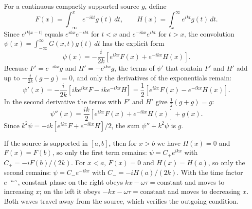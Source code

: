 For a continuous compactly supported source $g$, define
\[
F(x)=\int_{-\infty}^xe^{-ikt}g(t)\,dt,\qquad
H(x)=\int_x^\infty e^{ikt}g(t)\,dt.
\]
Since $e^{ik|x-t|}$ equals $e^{ikx}e^{-ikt}$ for $t<x$ and
$e^{-ikx}e^{ikt}$ for $t>x$, the convolution
$\psi(x)=\int_{-\infty}^\infty G(x,t)g(t)\,dt$ has the explicit form
\[
\psi(x)=-\frac{i}{2k}\left[e^{ikx}F(x)+e^{-ikx}H(x)\right].
\]
Because $F'=e^{-ikx}g$ and $H'=-e^{ikx}g$, the terms of $\psi'$ that
contain $F'$ and $H'$ add up to $-\frac{i}{2k}(g-g)=0$, and only the
derivatives of the exponentials remain:
\[
\psi'(x)=-\frac{i}{2k}\left[ike^{ikx}F-ike^{-ikx}H\right]
=\frac12\left[e^{ikx}F(x)-e^{-ikx}H(x)\right].
\]
In the second derivative the terms with $F'$ and $H'$ give
$\frac12(g+g)=g$:
\[
\psi''(x)=\frac{ik}{2}\left[e^{ikx}F(x)+e^{-ikx}H(x)\right]+g(x).
\]
Since $k^2\psi=-ik[e^{ikx}F+e^{-ikx}H]/2$, the sum $\psi''+k^2\psi$
is $g$.

If the source is supported in $[a,b]$, then for $x>b$ we have $H(x)=0$
and $F(x)=F(b)$, so only the first term remains:
$\psi=C_+e^{ikx}$ with $C_+=-iF(b)/(2k)$. For $x<a$, $F(x)=0$ and
$H(x)=H(a)$, so only the second remains: $\psi=C_-e^{-ikx}$ with
$C_-=-iH(a)/(2k)$. With the time factor $e^{-i\omega\tau}$, constant
phase on the right obeys $kx-\omega\tau=\text{constant}$ and moves
to increasing $x$; on the left it obeys $-kx-\omega\tau=\text{constant}$
and moves to decreasing $x$. Both waves travel away from the source,
which verifies the outgoing condition.

